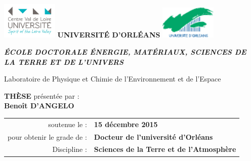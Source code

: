 {\parindent0pt %

\includegraphics[width=0.2\textwidth, valign=c]{./images/logos/pucvl}
\hfill
{\LARGE\textbf{UNIVERSITÉ D'ORLÉANS}}
\hfill
\includegraphics[width=0.2\textwidth, valign=c]{./images/logos/univ}

\begin{center}
	{\large\textit{\textbf{ÉCOLE DOCTORALE ÉNERGIE, MATÉRIAUX, SCIENCES DE LA TERRE ET DE L'UNIVERS}}}\\

	\vspace{1.1cm}

	{\large Laboratoire de Physique et Chimie de l'Environnement et de l'Espace} \\

	\vspace{1.1cm}

	{\Large\textbf{THÈSE}} présentée par :\\
	{\Large\textbf{Benoît D'ANGELO}}\\

	\vspace{1.1cm}

	\begin{tabular}{r l}
		soutenue le : & \textbf{15 décembre 2015} \\ [.8cm]
		pour obtenir le grade de : & \textbf{Docteur de l'universit\'e d'Orl\'eans}\\[.2cm]
		Discipline : &  \textbf{Sciences de la Terre et de l'Atmosphère}\\
	\end{tabular}
\end{center}

}
